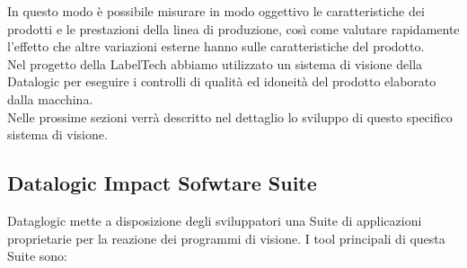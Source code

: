 \documentclass[12pt, a4paper, oneside]{book}
\begin{document}
In questo modo è possibile misurare in modo oggettivo le caratteristiche dei prodotti e le prestazioni della linea di produzione, così come valutare rapidamente l'effetto che altre variazioni esterne hanno sulle caratteristiche del prodotto.
\\Nel progetto della LabelTech abbiamo utilizzato un sistema di visione della Datalogic per eseguire i controlli di qualità ed idoneità del prodotto elaborato dalla macchina.
\\Nelle prossime sezioni verrà descritto nel dettaglio lo sviluppo di questo specifico sistema di visione.

\subsection{Datalogic Impact Sofwtare Suite}
Dataglogic mette a disposizione degli sviluppatori una Suite di applicazioni proprietarie per la reazione dei programmi di visione. I tool principali di questa Suite sono:
\end{document}
